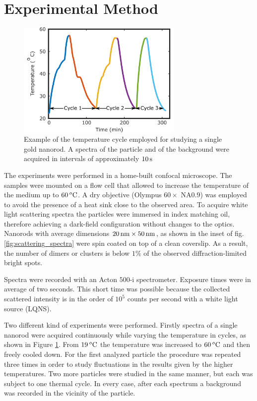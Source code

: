 \section{Experimental Method}
\begin{figure}[htp] \centering
\includegraphics[width=8cm]{Chapters/05_WhiteLight/Figures/Supplementary/01_Temp_Cycle/01_Temp_Cycle.png}
\caption{Example of the temperature cycle employed for studying a single gold
nanorod. A spectra of the particle and of the background were acquired in
intervals of approximately $10\,\textrm{s}$}
	\label{fig:temp-cycle}
\end{figure}

The experiments were performed in a home-built confocal microscope. The samples
were mounted on a flow cell that allowed to increase the temperature of the
medium up to $60\,^o\textrm{C}$. A dry objective (Olympus $60\times$ NA$0.9$) was
employed to avoid the presence of a heat sink close to the observed area. To
acquire white light scattering spectra the particles were immersed in index
matching oil, therefore achieving a dark-field configuration without changes to
the optics. Nanorods with average dimensions $20\,\textrm{nm}\times50\,\textrm{nm}$, as shown in the
inset of fig. \ref{fig:scattering_spectra} were spin coated on top of a clean
coverslip. As a result, the number of dimers or clusters is below $1\%$ of the
observed diffraction-limited bright spots.

Spectra were recorded with an Acton $500\textrm{-i}$ spectrometer. Exposure
times were in average of two seconds. This short time was possible because the
collected scattered intensity is in the order of $10^5$ counts per second with a
white light source (LQNS).

Two different kind of experiments were performed. Firstly spectra of a single
nanorod were acquired continuously while varying the temperature in cycles, as
shown in Figure \ref{fig:temp-cycle}. From $19\,^o\textrm{C}$ the temperature was
increased to $60\,^o\textrm{C}$ and then freely cooled down. For the first analyzed
particle the procedure was repeated three times in order to study fluctuations
in the results given by the higher temperatures. Two more particles were studied
in the same manner, but each was subject to one thermal cycle. In every case,
after each spectrum a background was recorded in the vicinity of the particle.
 
